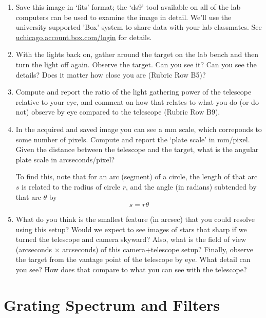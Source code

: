 \begin{enumerate}
	\item Save this image in ‘fits’ format; the ‘ds9’ tool available on all of the lab
	computers can be used to examine the image in detail. We’ll use the university supported
	’Box’ system to share data with your lab classmates. See \url{uchicago.account.box.com/login}
	for details.
	
	\item With the lights back on, gather around the target on the lab bench and then
	turn the light off again. Observe the target. Can you see it? Can you see the details? Does
	it matter how close you are (Rubric Row B5)?
	
	\item Compute and report the ratio of the light gathering power of
	the telescope relative to your eye, and comment on how that relates to what you do (or do
	not) observe by eye compared to the telescope (Rubric Row B9).
	
	\item In the acquired and saved image you can see a mm scale, which correponds to some number
	of pixels. Compute and report the ‘plate scale’ in mm/pixel. Given the distance between the
	telescope and the target, what is the angular plate scale in arcseconds/pixel?
	
	To find this, note that for an arc (segment) of a circle, the length of that arc $s$ is related to the radius of circle $r$, and the angle (in radians) subtended by that arc $\theta$ by
	\begin{equation}
	 s = r \theta
	\end{equation}
	
	\item What do you
	think is the smallest feature (in arcsec) that you could resolve using this setup? Would we
	expect to see images of stars that sharp if we turned the telescope and camera skyward?
	Also, what is the field of view (arcseconds $\times$
	arcseconds) of this camera+telescope setup? Finally, observe the target from the vantage
	point of the telescope by eye. What detail can you see? How does that compare to what
	you can see with the telescope?
\end{enumerate}

\section{Grating Spectrum and Filters}\label{sot:sec:grating}

